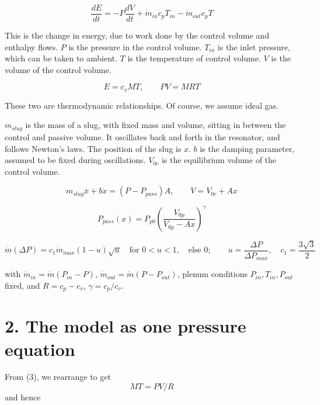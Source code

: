 \documentclass[11pt]{article}
\begin{document}
\begin{equation}
\frac{dE}{dt} = -P\frac{dV}{dt} + \dot{m}_{in}c_pT_{in} - \dot{m}_{out}c_pT \tag{2}
\end{equation}

This is the change in energy, due to work done by the control volume and enthalpy flows. $P$ is the pressure in the control volume. $T_{in}$ is the inlet pressure, which can be taken to ambient. $T$ is the temperature of control volume.  $V$ is the volume of the control volume. 

\begin{equation}
E = c_vMT, \qquad PV = MRT \tag{3}
\end{equation}

These two are thermodynamic relationships. Of course, we assume ideal gas. 

$m_{slug}$ is the mass of a slug, with fixed mass and volume, sitting in between the control and passive volume. It oscillates back and forth in the resonator, and follows Newton's laws. The position of the slug is $x$. $b$ is the damping parameter, assumed to be fixed during oscillations. $V_{0c}$ is the equilibrium volume of the control volume. 

\begin{equation}
m_{slug}\ddot x + b\dot x = (P - P_{pass})A, \qquad V = V_{0c} + Ax \tag{4}
\end{equation}

\begin{equation}
P_{pass}(x) = P_{p0}\left(\frac{V_{0p}}{V_{0p} - Ax}\right)^{\gamma} \tag{5}
\end{equation}

\begin{equation}
\dot{m}(\Delta P) = c_1\dot m_{max}(1-u)\sqrt{u} \quad \text{for } 0 < u < 1, \quad \text{else } 0; \qquad u = \frac{\Delta P}{\Delta P_{max}}, \quad c_1 = \frac{3\sqrt 3}{2} \tag{6}
\end{equation}

with $ \dot{m}_{in} =  \dot{m}(P_{in}-P)$, $ \dot{m}_{out} =  \dot{m}(P-P_{out})$, plenum conditions $P_{in}, T_{in}, P_{out}$ fixed, and $R = c_p - c_v$, $\gamma = c_p/c_v$.

\section*{2. The model as one pressure equation}

From (3), we rearrange to get 
\[
MT = PV/R
\]
 and hence
\end{document}
